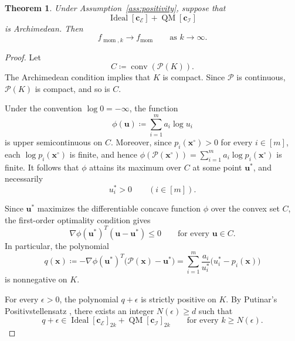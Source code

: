 \documentclass[pdflatex,sn-mathphys-num]{sn-jnl}%
\newcommand{\vect}[1]{\boldsymbol{#1}}
\theoremstyle{thmstyleone}%
\newtheorem{theorem}{Theorem}%
\theoremstyle{thmstyletwo}%
\theoremstyle{thmstylethree}%
\begin{document}
\begin{theorem}\label{thm:asymp}
Under Assumption~\ref{ass:positivity}, suppose that
\[
\operatorname{Ideal}[\vect{c}_{\mathcal{E}}]
+\operatorname{QM}[\vect{c}_{\mathcal{I}}]
\]
is Archimedean. Then
\[
f_{\operatorname{mom},k}
\longrightarrow f_{\operatorname{mom}}
\qquad\text{as }k\to\infty.
\]
\end{theorem}

{\color{red}
\begin{proof}
Let
\[
C\coloneqq\operatorname{conv}(\mathcal{P}(K)).
\]
The Archimedean condition implies that $K$ is compact. Since
$\mathcal{P}$ is continuous, $\mathcal{P}(K)$ is compact, and so is $C$.

Under the convention $\log 0=-\infty$, the function
\[
\phi(\vect{u})\coloneqq\sum_{i=1}^m a_i\log u_i
\]
is upper semicontinuous on $C$. Moreover, since
$p_i(\vect{x}^{\circ})>0$ for every $i\in[m]$, each
$\log p_i(\vect{x}^{\circ})$ is finite, and hence
$\phi(\mathcal{P}(\vect{x}^{\circ}))
=\sum_{i=1}^m a_i\log p_i(\vect{x}^{\circ})$ is finite.
It follows that $\phi$ attains its maximum over $C$ at
some point $\vect{u}^*$, and necessarily
\[
u_i^*>0\qquad(i\in[m]).
\]

Since $\vect{u}^*$ maximizes the differentiable concave function $\phi$
over the convex set $C$, the first-order optimality condition gives
\[
\nabla\phi(\vect{u}^*)^T(\vect{u}-\vect{u}^*)\leq0
\qquad\text{for every }\vect{u}\in C.
\]
In particular, the polynomial
\[
q(\vect{x})\coloneqq
-\nabla\phi(\vect{u}^*)^T\big(\mathcal{P}(\vect{x})-\vect{u}^*\big)
=
\sum_{i=1}^m\frac{a_i}{u_i^*}
\big(u_i^*-p_i(\vect{x})\big)
\]
is nonnegative on $K$.

For every $\epsilon>0$, the polynomial $q+\epsilon$ is strictly
positive on $K$. By Putinar's Positivstellensatz \cite{Putinar}, there
exists an
integer $N(\epsilon)\geq d$ such that
\[
q+\epsilon\in
\operatorname{Ideal}[\vect{c}_{\mathcal{E}}]_{2k}
+\operatorname{QM}[\vect{c}_{\mathcal{I}}]_{2k}
\qquad
\text{for every }k\geq N(\epsilon).
\]


\end{proof}}
\end{document}
